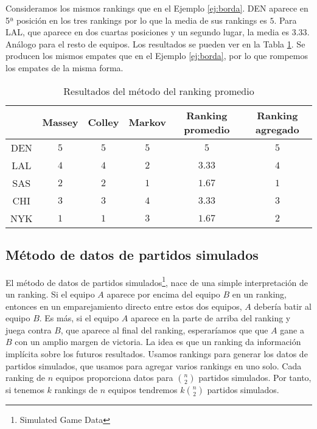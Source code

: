 \begin{ejemplo}
Consideramos los mismos rankings que en el Ejemplo \ref{ej:borda}. DEN aparece en 5ª posición en los tres rankings por lo que la media de sus rankings es $5$. Para LAL, que aparece en dos cuartas posiciones y un segundo lugar, la media es $3.33$. Análogo para el resto de equipos. Los resultados se pueden ver en la Tabla \ref{tbl:promedio_resultados}. Se producen los mismos empates que en el Ejemplo \ref{ej:borda}, por lo que rompemos los empates de la misma forma.

\begin{table}[h]
\centering
\caption{Resultados del método del ranking promedio}
\label{tbl:promedio_resultados}
\begin{tabular}{@{}cccccc@{}}
\cmidrule(l){2-6}
    & Massey & Colley & Markov & Ranking promedio & Ranking agregado \\ \midrule
DEN & $5$    & $5$    & $5$    & $5$              & $5$              \\
LAL & $4$    & $4$    & $2$    & $3.33$           & $4$              \\
SAS & $2$    & $2$    & $1$    & $1.67$           & $1$              \\
CHI & $3$    & $3$    & $4$    & $3.33$           & $3$              \\
NYK & $1$    & $1$    & $3$    & $1.67$           & $2$              \\ \bottomrule
\end{tabular}
\end{table}

\end{ejemplo}


\subsection{Método de datos de partidos simulados}

El método de datos de partidos simulados\footnote{Simulated Game Data}, nace de una simple interpretación de un ranking. Si el equipo $A$ aparece por encima del equipo $B$ en un ranking, entonces en un emparejamiento directo entre estos dos equipos, $A$ debería batir al equipo $B$. Es más, si el equipo $A$ aparece en la parte de arriba del ranking y juega contra $B$, que aparece al final del ranking, esperaríamos que que $A$ gane a $B$ con un amplio margen de victoria. La idea es que un ranking da información implícita sobre los futuros resultados. Usamos rankings para generar los datos de partidos simulados, que usamos para agregar varios rankings en uno solo. Cada ranking de $n$ equipos proporciona datos para $\binom{n}{2}$ partidos simulados. Por tanto, si tenemos $k$ rankings de $n$ equipos tendremos $k \binom{n}{2}$ partidos simulados.\\

